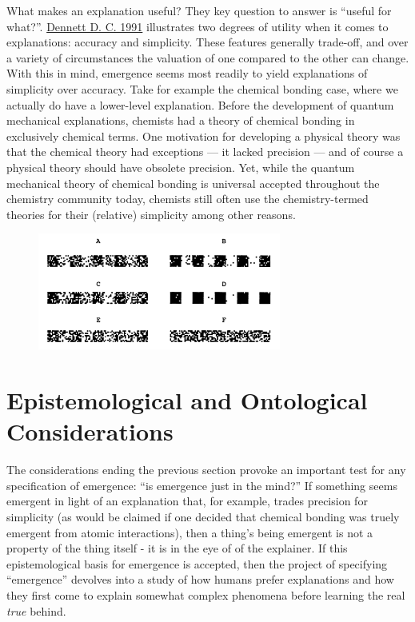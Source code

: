 \documentclass{article}
\newcommand{\ti}[1]{\textit{#1}}
\renewcommand{\cite}[1]{\hyperlink{#1}{#1}}
\begin{document}
What makes an explanation useful? They key question to answer is ``useful for what?''. \cite{Dennett D. C. 1991} illustrates two degrees of utility when it comes to explanations: accuracy and simplicity. These features generally trade-off, and over a variety of circumstances the valuation of one compared to the other can change. With this in mind, emergence seems most readily to yield explanations of simplicity over accuracy. Take for example the chemical bonding case, where we actually do have a lower-level explanation. Before the development of quantum mechanical explanations, chemists had a theory of chemical bonding in exclusively chemical terms. One motivation for developing a physical theory was that the chemical theory had exceptions --- it lacked precision --- and of course a physical theory should have obsolete precision. Yet, while the quantum mechanical theory of chemical bonding is universal accepted throughout the chemistry community today, chemists still often use the chemistry-termed theories for their (relative) simplicity among other reasons.

\begin{figure}[h]
\centering
\includegraphics[width=8cm]{barcode}
\end{figure}

\section{Epistemological and Ontological Considerations}


The considerations ending the previous section provoke an important test for any specification of emergence: ``is emergence just in the mind?'' If something seems emergent in light of an explanation that, for example, trades precision for simplicity (as would be claimed if one decided that chemical bonding was truely emergent from atomic interactions), then a thing's being emergent is not a property of the thing itself - it is in the eye of of the explainer. If this epistemological basis for emergence is accepted, then the project of specifying ``emergence'' devolves into a study of how humans prefer explanations and how they first come to explain somewhat complex phenomena before learning the real \ti{true} behind.
\end{document}
